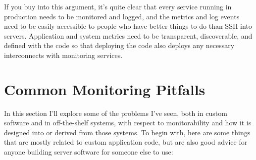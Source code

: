 \documentclass{vivid_layout}
\begin{document}
If you buy into this argument, it's quite clear that every service running in
production needs to be monitored and logged, and the metrics and log events need
to be easily accessible to people who have better things to do than SSH into
servers. Application and system metrics need to be transparent, discoverable,
and defined with the code so that deploying the code also deploys any necessary
interconnects with monitoring services.

\section{Common Monitoring Pitfalls}

In this section I'll explore some of the problems I've seen, both in custom
software and in off-the-shelf systems, with respect to monitorability and how it
is designed into or derived from those systems. To begin with, here are some
things that are mostly related to custom application code, but are also good
advice for anyone building server software for someone else to use:
\end{document}
